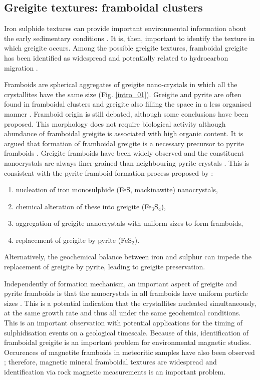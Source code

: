 \subsection{Greigite textures: framboidal clusters}
Iron sulphide textures can provide important environmental information about the early sedimentary conditions \citep{Roberts2015}. It is, then, important to identify the texture in which greigite occurs. Among the possible greigite textures, framboidal greigite has been identified as widespread \citep{Ariztegui1996,Wilkin1997} and potentially related to hydrocarbon migration \citep{Aldana1999}.\par

Framboids are spherical aggregates of greigite nano-crystals in which all the crystallites have the same size (Fig. \ref{intro_01}). Greigite and pyrite are often found in framboidal clusters and greigite also filling the space in a less organised manner \citep{Wilkin1997,Roberts2005,Roberts2010,Rowan2006}. Framboid origin is still debated, although some conclusions have been proposed. This morphology does not require biological activity \citep{Sweeney1973,Wilkin1996} although abundance of framboidal greigite is associated with high organic content. It is argued that formation of framboidal greigite is a necessary precursor to pyrite framboids \citep{Sweeney1973,Wilkin1997}. Greigite framboids have been widely observed and the constituent nanocrystals are always finer-grained than neighbouring pyrite crystals \citep{Ariztegui1996,Roberts2005,Roberts2010,Rowan2006}. This is consistent with the pyrite framboid formation process proposed by \citet{Wilkin1997}:
\begin{enumerate}
\item nucleation of iron monosulphide (FeS, mackinawite) nanocrystals,
\item chemical alteration of these into greigite (Fe$_3$S$_4$),
\item aggregation of greigite nanocrystals with uniform sizes to form framboids,
\item replacement of greigite by pyrite (FeS$_2$).
\end{enumerate}
Alternatively, the geochemical balance between iron and sulphur can impede the replacement of greigite by pyrite, leading to greigite preservation.\par

Independently of formation mechanism, an important aspect of greigite and pyrite framboids is that the nanocrystals in all framboids have uniform particle sizes \citep{Wilkin1996}. This is a potential indication that the crystallites nucleated simultaneously, at the same growth rate and thus all under the same geochemical conditions. This is an important observation with potential applications for the timing of sulphidisation events on a geological timescale. Because of this, identification of framboidal greigite is an important problem for environmental magnetic studies. Occurences of magnetite framboids in meteoritic samples have also been observed \citep{Astafieva2004,Kimura2013}; therefore, magnetic mineral framboidal textures are widespread and identification via rock magnetic measurements is an important problem.\par


